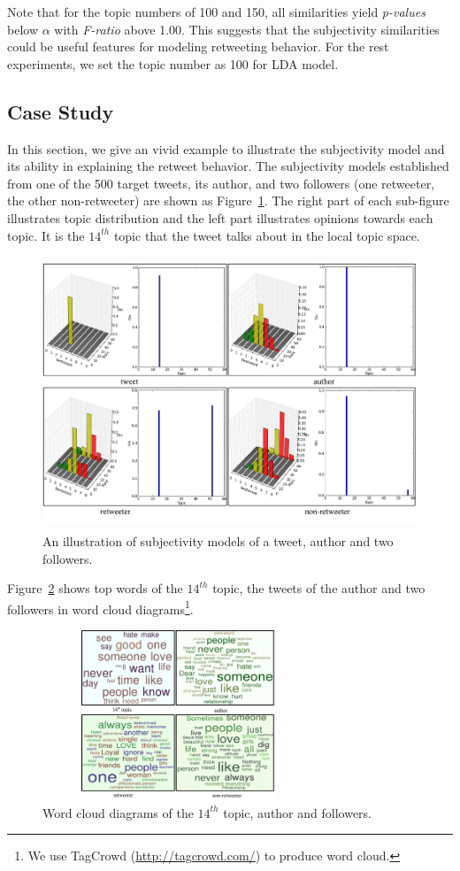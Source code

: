 \documentclass{acm_proc_article-sp}
\begin{document}
Note that for the topic numbers of 100 and 150, all similarities yield \textit{p-values} below $ \alpha $ with \textit{F-ratio} above 1.00. This suggests that the subjectivity similarities could be useful features for modeling retweeting behavior. 
For the rest experiments, we set the topic number as 100 for LDA model. 

\subsection{Case Study}
\label{example}
In this section, we give an vivid example to illustrate the subjectivity model and its ability in explaining the retweet behavior. 
The subjectivity models established from one of the 500 target tweets, its author, and two followers (one retweeter, the other non-retweeter) are shown as Figure~\ref{fig5}. 
The right part of each sub-figure illustrates topic distribution and the left part illustrates opinions towards each topic. 
It is the $ 14^{th} $ topic that the tweet talks about in the local topic space. 
\begin{figure}[htb]
\centering
\includegraphics[width=5.5in,height=3.2in]{fig5.pdf}
\caption{An illustration of subjectivity models of a tweet, author and two followers.}
\label{fig5}
\end{figure}
Figure~\ref{fig6} shows top words of the $ 14^{th} $ topic, the tweets of the author and two followers in word cloud diagrams\footnote{We use TagCrowd (\url{http://tagcrowd.com/}) to produce word cloud.}.
\begin{figure}[htb]
\centering
\includegraphics[width=3.2in,height=2.0in]{fig6.pdf}
\caption{Word cloud diagrams of the $ 14^{th} $ topic, author and followers.}
\label{fig6}
\end{figure}
\end{document}

